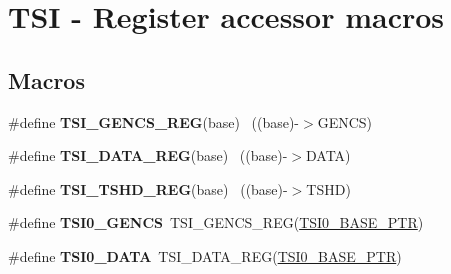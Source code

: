 \hypertarget{group___t_s_i___register___accessor___macros}{}\section{T\+S\+I -\/ Register accessor macros}
\label{group___t_s_i___register___accessor___macros}
\subsection*{Macros}
\begin{DoxyCompactItemize}
\item 
\hypertarget{group___t_s_i___register___accessor___macros_gacb2292491464fa55b36996380b09077f}{}\#define {\bfseries T\+S\+I\+\_\+\+G\+E\+N\+C\+S\+\_\+\+R\+E\+G}(base)                                        ~((base)-\/$>$G\+E\+N\+C\+S)\label{group___t_s_i___register___accessor___macros_gacb2292491464fa55b36996380b09077f}

\item 
\hypertarget{group___t_s_i___register___accessor___macros_gab8a711133e324dcb170ee244de065488}{}\#define {\bfseries T\+S\+I\+\_\+\+D\+A\+T\+A\+\_\+\+R\+E\+G}(base)                                          ~((base)-\/$>$D\+A\+T\+A)\label{group___t_s_i___register___accessor___macros_gab8a711133e324dcb170ee244de065488}

\item 
\hypertarget{group___t_s_i___register___accessor___macros_ga4ecfdd78411a0b04595c47c3fc3393ec}{}\#define {\bfseries T\+S\+I\+\_\+\+T\+S\+H\+D\+\_\+\+R\+E\+G}(base)                                          ~((base)-\/$>$T\+S\+H\+D)\label{group___t_s_i___register___accessor___macros_ga4ecfdd78411a0b04595c47c3fc3393ec}

\item 
\hypertarget{group___t_s_i___register___accessor___macros_gabe033284ba64fa3097ff12d10c0b5e85}{}\#define {\bfseries T\+S\+I0\+\_\+\+G\+E\+N\+C\+S}~T\+S\+I\+\_\+\+G\+E\+N\+C\+S\+\_\+\+R\+E\+G(\hyperlink{group___t_s_i___peripheral_gaf98ea1cd15559446e0cfc1ae177751f6}{T\+S\+I0\+\_\+\+B\+A\+S\+E\+\_\+\+P\+T\+R})\label{group___t_s_i___register___accessor___macros_gabe033284ba64fa3097ff12d10c0b5e85}

\item 
\hypertarget{group___t_s_i___register___accessor___macros_gac08465d7c2f98c2c372c26e622a05126}{}\#define {\bfseries T\+S\+I0\+\_\+\+D\+A\+T\+A}~T\+S\+I\+\_\+\+D\+A\+T\+A\+\_\+\+R\+E\+G(\hyperlink{group___t_s_i___peripheral_gaf98ea1cd15559446e0cfc1ae177751f6}{T\+S\+I0\+\_\+\+B\+A\+S\+E\+\_\+\+P\+T\+R})\label{group___t_s_i___register___accessor___macros_gac08465d7c2f98c2c372c26e622a05126}


\end{DoxyCompactItemize}
